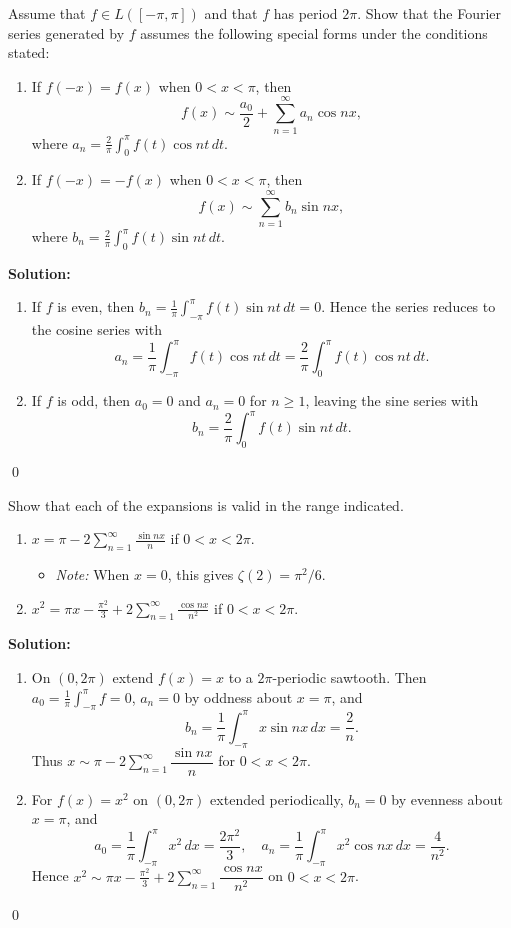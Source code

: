 \begin{problembox}
Assume that $f \in L([-\pi, \pi])$ and that $f$ has period $2\pi$. Show that the Fourier series generated by $f$ assumes the following special forms under the conditions stated:
\begin{enumerate}[label=(\alph*)]
\item If $f(-x) = f(x)$ when $0 < x < \pi$, then
\[
f(x) \sim \frac{a_0}{2} + \sum_{n=1}^\infty a_n \cos nx,
\]
where $a_n = \frac{2}{\pi} \int_0^\pi f(t) \cos nt \, dt$.
\item If $f(-x) = -f(x)$ when $0 < x < \pi$, then
\[
f(x) \sim \sum_{n=1}^\infty b_n \sin nx,
\]
where $b_n = \frac{2}{\pi} \int_0^\pi f(t) \sin nt \, dt$.
\end{enumerate}
\end{problembox}

\noindent\textbf{Solution:}
\begin{enumerate}[label=(\alph*)]
\item If $f$ is even, then $b_n=\tfrac{1}{\pi}\int_{-\pi}^{\pi} f(t)\sin nt\,dt=0$. Hence the series reduces to the cosine series with
\[a_n=\frac{1}{\pi}\int_{-\pi}^{\pi} f(t)\cos nt\,dt=\frac{2}{\pi}\int_0^{\pi} f(t)\cos nt\,dt.\]
\item If $f$ is odd, then $a_0=0$ and $a_n=0$ for $n\ge1$, leaving the sine series with
\[b_n=\frac{2}{\pi}\int_0^{\pi} f(t)\sin nt\,dt.\]
\end{enumerate}\qed


\begin{problembox}
Show that each of the expansions is valid in the range indicated.
\begin{enumerate}[label=(\alph*)]
\item $x = \pi - 2 \sum_{n=1}^\infty \frac{\sin nx}{n}$ if $0 < x < 2\pi$.
\begin{itemize}
\item \textit{Note:} When $x = 0$, this gives $\zeta(2) = \pi^2/6$.
\end{itemize}
\item $x^2 = \pi x - \frac{\pi^2}{3} + 2 \sum_{n=1}^\infty \frac{\cos nx}{n^2}$ if $0 < x < 2\pi$.
\end{enumerate}
\end{problembox}

\noindent\textbf{Solution:}
\begin{enumerate}[label=(\alph*)]
\item On $(0,2\pi)$ extend $f(x)=x$ to a $2\pi$-periodic sawtooth. Then $a_0=\tfrac{1}{\pi}\int_{-\pi}^{\pi} f=0$, $a_n=0$ by oddness about $x=\pi$, and
\[b_n=\frac{1}{\pi}\int_{-\pi}^{\pi} x\sin nx\,dx=\frac{2}{n}.\]
Thus $x\sim \pi-2\sum_{n=1}^{\infty} \dfrac{\sin nx}{n}$ for $0<x<2\pi$.
\item For $f(x)=x^2$ on $(0,2\pi)$ extended periodically, $b_n=0$ by evenness about $x=\pi$, and
\[a_0=\frac{1}{\pi}\int_{-\pi}^{\pi} x^2\,dx=\frac{2\pi^2}{3},\quad a_n=\frac{1}{\pi}\int_{-\pi}^{\pi} x^2\cos nx\,dx=\frac{4}{n^2}.\]
Hence $x^2\sim \pi x-\tfrac{\pi^2}{3}+2\sum_{n=1}^{\infty}\dfrac{\cos nx}{n^2}$ on $0<x<2\pi$.
\end{enumerate}\qed


